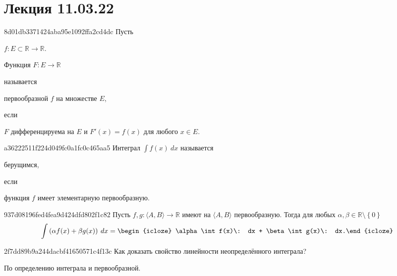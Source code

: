 \section{Лекция 11.03.22}
\begin{note}{8d01db3371424aba95e1092ffa2cd4dc}
    Пусть \begin{icloze}{3}\( f : E \subset \mathbb R \to \mathbb R \).\end{icloze} \begin{icloze}{1}Функция \( F : E \to \mathbb R \)\end{icloze} называется \begin{icloze}{2}первообразной \( f \) на множестве \( E \),\end{icloze} если \begin{icloze}{1}\( F \) дифференцируема на \( E \) и \( F'(x) = f(x) \) для любого \( x \in E \).\end{icloze}
\end{note}

\begin{note}{a36222511f224d049fc0a1fc0c465aa5}
    Интеграл \( \int f(x)\: dx \) называется \begin{icloze}{2}берущимся,\end{icloze} если \begin{icloze}{1}функция \( f \) имеет элементарную первообразную.\end{icloze}
\end{note}

\begin{note}{937d08196fed4fea9d424dfd802f1c82}
    Пусть \( f, g : \langle A, B \rangle \to \mathbb R \) имеют на  \( \langle A, B \rangle \) первообразную. Тогда для любых \( \alpha, \beta \in \mathbb R \setminus \left\{ 0 \right\} \)
    \[
        \int \left( \alpha f(x) + \beta g(x) \right)\: dx = \begin{icloze}{1}\alpha \int f(x)\: dx + \beta \int g(x)\: dx.\end{icloze}
    \]
\end{note}

\begin{note}{2f7dd89b9a244dacbf41650571c4f13c}
    Как доказать свойство линейности неопределённого интеграла?

    \begin{cloze}{1}
        По определению интеграла и первообразной.
    \end{cloze}
\end{note}

